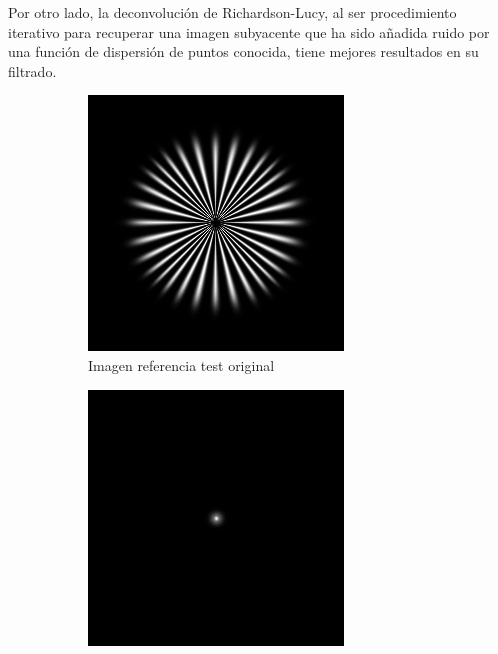\documentclass{./packages/optica-article}
\begin{document}
Por otro lado, la deconvolución de Richardson-Lucy, al ser procedimiento iterativo para recuperar una imagen subyacente que ha sido añadida ruido por una función de dispersión de puntos conocida, tiene mejores resultados en su filtrado.

\begin{figure}[hbp]
	\begin{center}
		\begin{subfigure}[t]{0.4\textwidth}\centering
			\centering
			\includegraphics[width=\textwidth]{Simulation deconvolution/ref.jpg}
			\caption{Imagen referencia test original}\label{fig:ref}
		\end{subfigure}
		\quad
		\begin{subfigure}[t]{0.4\textwidth}\centering
			\includegraphics[width=\textwidth]{Simulation deconvolution/psf.jpg}

\end{subfigure}
\end{center}
\end{figure}
\end{document}
